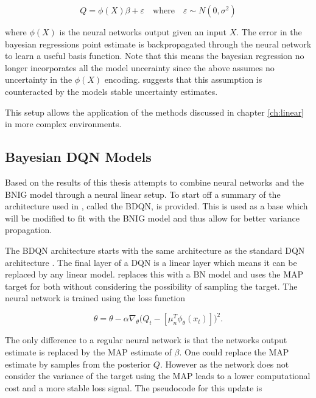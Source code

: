 \begin{equation*}
	Q = \phi(X)\beta + \varepsilon \quad \text{where} \quad \varepsilon \sim N(0,\sigma^2)
\end{equation*}

where $\phi(X)$ is the neural networks output given an input $X$. The error in the bayesian regressions point estimate is backpropagated through the neural network to learn a useful basis function. Note that this means the bayesian regression no longer incorporates all the model uncerainty since the above assumes no uncertainty in the $\phi(X)$ encoding. \cite{carlos_2018} suggests that this assumption is counteracted by the models stable uncertainty estimates.

This setup allows the application of the methods discussed in chapter \ref{ch:linear} in more complex environments.

\subsection{Bayesian DQN Models}

Based on the results of \cite{carlos_2018} this thesis attempts to combine neural networks and the BNIG model through a neural linear setup. To start off a summary of the architecture used in \cite{azziz_2018}, called the BDQN, is provided. This is used as a base which will be modified to fit with the BNIG model and thus allow for better variance propagation.

The BDQN architecture starts with the same architecture as the standard DQN architecture \citep{mnih_2015}. The final layer of a DQN is a linear layer which means it can be replaced by any linear model. \cite{azziz_2018} replaces this with a BN model and uses the MAP target for both without considering the possibility of sampling the target. The neural network is trained using the loss function

\begin{equation*}
	\theta = \theta - \alpha\nabla_\theta\big(Q_t - [\mu_n^T\phi_\theta(x_t)]\big)^2.
\end{equation*}

 The only difference to a regular neural network is that the networks output estimate is replaced by the MAP estimate of $\beta$. One could replace the MAP estimate by samples from the posterior $Q$. However as the network does not consider the variance of the target using the MAP leads to a lower computational cost and a more stable loss signal. The pseudocode for this update is


